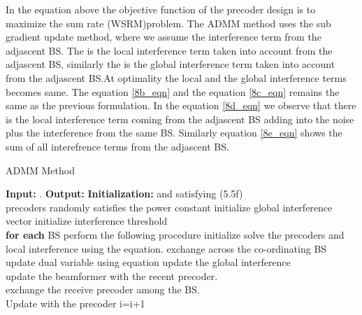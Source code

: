 In the equation above the objective function of the precoder design is to maximize the sum rate (WSRM)problem. The ADMM method uses the sub gradient update method, where we assume the interference term from the adjascent BS. The  is the local interference term taken into account from the adjascent BS, similarly the  is the global interference term taken into account from the adjascent BS.At optimality the local and the global interference terms becomes same. The equation \eqref{8b_eqn} and the equation \eqref{8c_eqn} remains the same as the previous formulation. In the equation \eqref{8d_eqn} we observe that there is the local interference term coming from the adjascent BS adding into the noise plus the interference from the same BS. Similarly equation \eqref{8e_eqn} shows the sum of all interefrence terms from the adjascent BS.

\begin{algorithm}[h]
	\caption[Distributed Precoder Design]{ADMM Method}
	\label{algo-1}
	\begin{algorithmic}
		\label{algo--1}
		\STATE \textbf{Input:} .
		\STATE \textbf{Output:} 
		\STATE \textbf{Initialization:}  and  satisfying (5.5f)\\
		precoders randomly satisfies the power constant 
		\STATE initialize global interference vector 
		\STATE initialize interference threshold \\
		\STATE \textbf{for each} \ac{BS}  perform the following procedure
		\REPEAT 
		\STATE initialize  
		\REPEAT	
		\STATE solve the precoders  and local interference  using the equation.
		\STATE exchange  across the co-ordinating \ac{BS} 
		\STATE update dual variable \me{\lambda} using equation
		\STATE update the global interference
		\\
		\STATE update the beamformer  with the recent precoder.\\ 
		\STATE exchange the receive precoder  among the \ac{BS}.\\
		Update  with the precoder 
		i=i+1
	\end{algorithmic} 
\end{algorithm}

